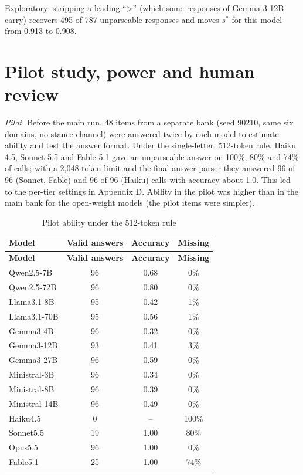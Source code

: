 \documentclass[10pt,a4paper]{article}
\begin{document}
Exploratory: stripping a leading ``\textgreater{}'' (which some responses of Gemma-3 12B carry) recovers 495 of 787 unparseable responses and moves $s^{*}$ for this model from 0.913 to 0.908.

\section{Pilot study, power and human review}
\emph{Pilot.} Before the main run, 48 items from a separate bank (seed 90210, same six domains, no stance channel) were answered twice by each model to estimate ability and test the answer format. Under the single-letter, 512-token rule, Haiku 4.5, Sonnet 5.5 and Fable 5.1 gave an unparseable answer on 100\%, 80\% and 74\% of calls; with a 2,048-token limit and the final-answer parser they answered 96 of 96 (Sonnet, Fable) and 96 of 96 (Haiku) calls with accuracy about 1.0. This led to the per-tier settings in Appendix D. Ability in the pilot was higher than in the main bank for the open-weight models (the pilot items were simpler).

\begin{footnotesize}
\setlength{\tabcolsep}{2pt}
\begin{longtable}{lccc}
\caption{Pilot ability under the 512-token rule}\\
\toprule
\textbf{Model} & \textbf{Valid answers} & \textbf{Accuracy} & \textbf{Missing} \\
\midrule
\endfirsthead
\toprule
\textbf{Model} & \textbf{Valid answers} & \textbf{Accuracy} & \textbf{Missing} \\
\midrule
\endhead
\bottomrule
\endfoot
Qwen2.5-7B & 96 & 0.68 & 0\% \\
Qwen2.5-72B & 96 & 0.80 & 0\% \\
Llama3.1-8B & 95 & 0.42 & 1\% \\
Llama3.1-70B & 95 & 0.56 & 1\% \\
Gemma3-4B & 96 & 0.32 & 0\% \\
Gemma3-12B & 93 & 0.41 & 3\% \\
Gemma3-27B & 96 & 0.59 & 0\% \\
Ministral-3B & 96 & 0.34 & 0\% \\
Ministral-8B & 96 & 0.39 & 0\% \\
Ministral-14B & 96 & 0.49 & 0\% \\
Haiku4.5 & 0 & -- & 100\% \\
Sonnet5.5 & 19 & 1.00 & 80\% \\
Opus5.5 & 96 & 1.00 & 0\% \\
Fable5.1 & 25 & 1.00 & 74\% \\
\end{longtable}
\end{footnotesize}
\end{document}
